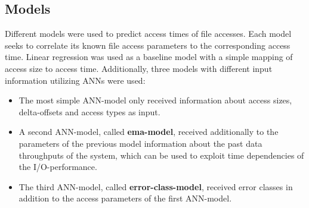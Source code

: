 \documentclass{superfri}
\begin{document}
\subsection{Models}
Different models were used to predict access times of file accesses.
Each model seeks to correlate its known file access parameters to the corresponding access time. 
Linear regression was used as a baseline model with a simple mapping of access size to access time.
Additionally, three models with different input information utilizing ANNs were used:
\begin{itemize}
	\item The most simple ANN-model only received information about access sizes, delta-offsets and access types as input.
	\item A second ANN-model, called \textbf{ema-model}, received additionally to the parameters of the previous model information about the past data throughputs of the system, which can be used to exploit time dependencies of the I/O-performance.
	\item The third ANN-model, called \textbf{error-class-model}, received error classes in addition to the access parameters of the first ANN-model.
\end{itemize}\medskip
\end{document}
